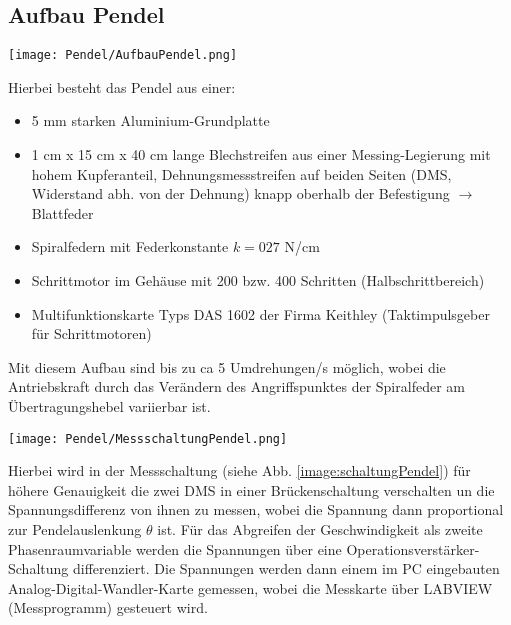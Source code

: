 \subsection{Aufbau Pendel}
\label{sub:aufbauPendel}
\begin{center}
    \texttt{[image: Pendel/AufbauPendel.png]}
    \label{image:aufbauPendel}
\end{center}
Hierbei besteht das Pendel aus einer:
\begin{itemize}
    \item 5 mm starken Aluminium-Grundplatte
    \item 1 cm x 15 cm x 40 cm lange Blechstreifen aus einer Messing-Legierung mit hohem Kupferanteil, Dehnungsmessstreifen auf beiden Seiten (DMS, Widerstand abh. von der Dehnung) knapp oberhalb der Befestigung $\rightarrow$ Blattfeder
    \item Spiralfedern mit Federkonstante $k=027$ N/cm 
    \item Schrittmotor im Gehäuse mit 200 bzw. 400 Schritten (Halbschrittbereich)
    \item Multifunktionskarte Typs DAS 1602 der Firma Keithley (Taktimpulsgeber für Schrittmotoren)
\end{itemize}
Mit diesem Aufbau sind bis zu ca 5 Umdrehungen/s möglich, wobei die Antriebskraft durch das Verändern des Angriffspunktes der Spiralfeder am Übertragungshebel variierbar ist.
\begin{center}
    \texttt{[image: Pendel/MessschaltungPendel.png]}
    \label{image:schaltungPendel}
\end{center}
Hierbei wird in der Messschaltung (siehe Abb. \ref{image:schaltungPendel}) für höhere Genauigkeit die zwei DMS in einer Brückenschaltung verschalten un die Spannungsdifferenz von ihnen zu messen, wobei die Spannung dann proportional zur Pendelauslenkung $\theta$ ist. Für das Abgreifen der Geschwindigkeit als zweite Phasenraumvariable werden die Spannungen über eine Operationsverstärker-Schaltung differenziert. Die Spannungen werden dann einem im PC eingebauten Analog-Digital-Wandler-Karte gemessen, wobei die Messkarte über LABVIEW (Messprogramm) gesteuert wird. \citep{Lueck}
